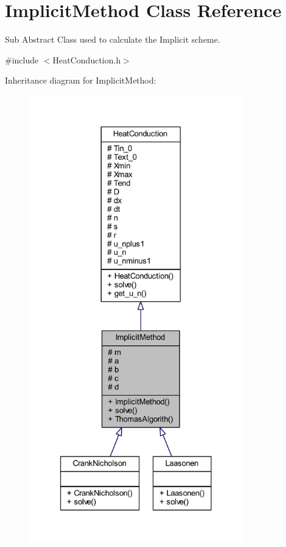 \hypertarget{class_implicit_method}{}\section{Implicit\+Method Class Reference}
\label{class_implicit_method}


Sub Abstract Class used to calculate the Implicit scheme.  




{\ttfamily \#include $<$Heat\+Conduction.\+h$>$}



Inheritance diagram for Implicit\+Method\+:
\nopagebreak
\begin{figure}[H]
\begin{center}
\leavevmode
\includegraphics[height=550pt]{class_implicit_method__inherit__graph}
\end{center}
\end{figure}


